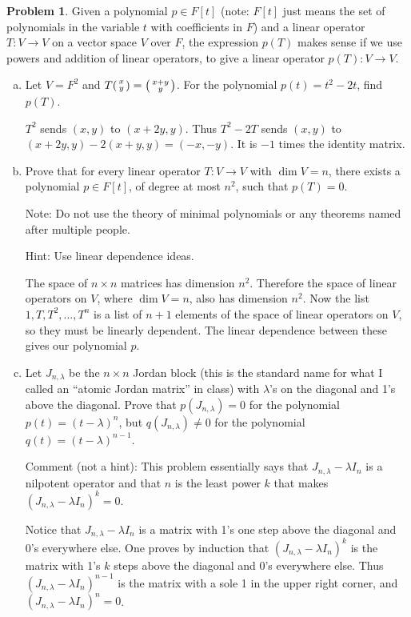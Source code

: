 \documentclass[11pt,oneside]{amsart}
\theoremstyle{definition}
\newtheorem{problem}{Problem}
\newcommand*\colvec[1]{\begin{psmallmatrix}#1\end{psmallmatrix}}
\begin{document}
    \begin{problem}
        Given a polynomial $p\in F[t]$ (note: $F[t]$ just means the set of polynomials in the variable $t$ with coefficients in $F$) and a linear operator $T\colon V\to V$ on a vector space $V$ over $F$, the expression $p(T)$ makes sense if we use powers and addition of linear operators, to give a linear operator $p(T)\colon V\to V$.

        \begin{enumerate}[(a)]
            \item Let $V=F^2$ and $T\colvec{x\\y}=\colvec{x+y\\y}$. For the polynomial $p(t)=t^2-2t$, find $p(T)$.
            \begin{solution}
                $T^2$ sends $(x,y)$ to $(x+2y,y)$. Thus $T^2-2T$ sends $(x,y)$ to $(x+2y,y)-2(x+y,y)=(-x,-y)$. It is $-1$ times the identity matrix.
            \end{solution}
            \item Prove that for every linear operator $T\colon V\to V$ with $\dim V=n$, there exists a polynomial $p\in F[t]$, of degree at most $n^2$, such that $p(T)=0$.
            
            Note: Do not use the theory of minimal polynomials or any theorems named after multiple people.

            Hint: Use linear dependence ideas.
            \begin{solution}
                The space of $n\times n$ matrices has dimension $n^2$. Therefore the space of linear operators on $V$, where $\dim V=n$, also has dimension $n^2$. Now the list $1,T,T^2,\dots,T^n$ is a list of $n+1$ elements of the space of linear operators on $V$, so they must be linearly dependent. The linear dependence between these gives our polynomial $p$.
            \end{solution}
            \item Let $J_{n,\lambda}$ be the $n\times n$ Jordan block (this is the standard name for what I called an ``atomic Jordan matrix'' in class) with $\lambda$'s on the diagonal and 1's above the diagonal. Prove that $p(J_{n,\lambda})=0$ for the polynomial $p(t)=(t-\lambda)^n$, but $q(J_{n,\lambda})\neq 0$ for the polynomial $q(t)=(t-\lambda)^{n-1}$.
            
            Comment (not a hint): This problem essentially says that $J_{n,\lambda}-\lambda I_n$ is a nilpotent operator and that $n$ is the least power $k$ that makes $(J_{n,\lambda}-\lambda I_n)^k=0$.
            \begin{solution}
                Notice that $J_{n,\lambda}-\lambda I_n$ is a matrix with 1's one step above the diagonal and 0's everywhere else. One proves by induction that $(J_{n,\lambda}-\lambda I_n)^k$ is the matrix with 1's $k$ steps above the diagonal and 0's everywhere else. Thus $(J_{n,\lambda}-\lambda I_n)^{n-1}$ is the matrix with a sole 1 in the upper right corner, and $(J_{n,\lambda}-\lambda I_n)^n=0$.
            \end{solution}
        \end{enumerate}
    \end{problem}
    
\end{document}
